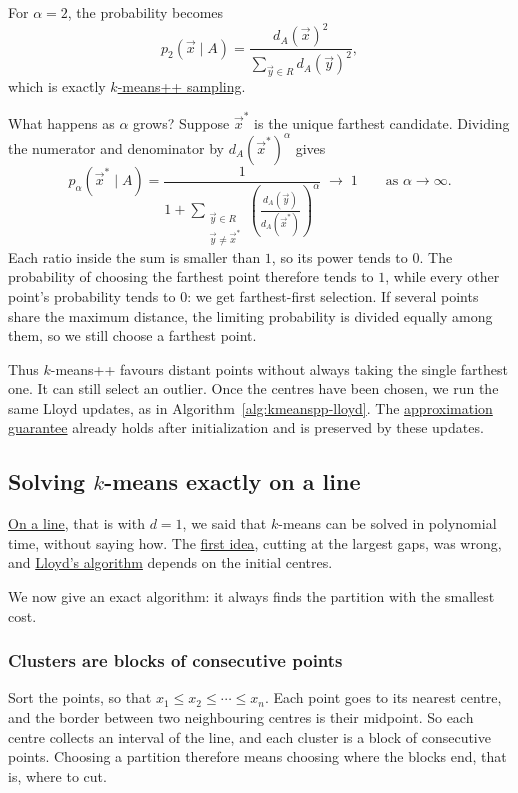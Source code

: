 \documentclass[a4paper,12pt,oneside]{report}
\begin{document}
For $\alpha=2$, the probability becomes
\[
  p_2(\vec x\mid A)=
  \frac{d_A(\vec x)^2}{\displaystyle\sum_{\vec y\in R}d_A(\vec y)^2},
\]
which is exactly \hyperref[sec:kmeanspp-sampling]{$k$-means++ sampling}.

What happens as $\alpha$ grows? Suppose $\vec x^*$ is the unique
farthest candidate. Dividing the numerator and denominator by
$d_A(\vec x^*)^\alpha$ gives
\[
  p_\alpha(\vec x^*\mid A)=
  \frac{1}{1+\displaystyle\sum_{\substack{\vec y\in R\\\vec y\neq\vec x^*}}
    \left(\frac{d_A(\vec y)}{d_A(\vec x^*)}\right)^\alpha}
  \;\longrightarrow\;1
  \qquad\text{as }\alpha\to\infty.
\]
Each ratio inside the sum is smaller than $1$, so its power tends
to $0$. The probability of choosing the farthest point therefore
tends to $1$, while every other point's probability tends to $0$:
we get farthest-first selection. If several points share the
maximum distance, the limiting probability is divided equally
among them, so we still choose a farthest point.

Thus $k$-means++ favours distant points without always taking the
single farthest one. It can still select an outlier. Once the
centres have been chosen, we run the same Lloyd updates, as in
Algorithm~\ref{alg:kmeanspp-lloyd}. The
\hyperref[prop:kmeanspp-guarantee]{approximation guarantee} already
holds after initialization and is preserved by these updates.

\subsection{Solving $k$-means exactly on a line}
\label{sec:kmeans-line-dp}

\hyperref[sec:kmeans-line]{On a line}, that is with $d=1$, we said that
$k$-means can be solved in polynomial time, without saying how. The
\hyperref[sec:kmeans-line-gaps]{first idea}, cutting at the largest
gaps, was wrong, and \hyperref[sec:lloyd]{Lloyd's algorithm} depends on
the initial centres.

We now give an exact algorithm: it always finds the partition with the
smallest cost.

\subsubsection{Clusters are blocks of consecutive points}

Sort the points, so that $x_1\leq x_2\leq\cdots\leq x_n$. Each point
goes to its nearest centre, and the border between two neighbouring
centres is their midpoint. So each centre collects an interval of the
line, and each cluster is a block of consecutive points. Choosing a
partition therefore means choosing where the blocks end, that is,
where to cut.
\end{document}

